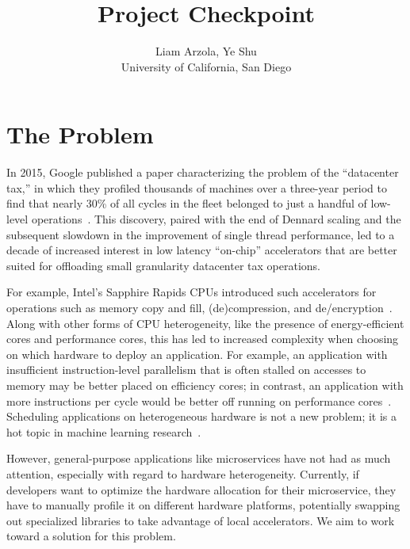 \documentclass[letterpaper,twocolumn,10pt]{article}
\begin{document}
\date{}
\title{Project Checkpoint}

\author{
{\rm Liam Arzola, Ye Shu}\\
University of California, San Diego
}

\maketitle

\section{The Problem}
In 2015, Google published a paper characterizing the problem of the ``datacenter tax,'' in which they profiled thousands of machines over a three-year period to find that nearly 30\% of all cycles in the fleet belonged to just a handful of low-level operations~\cite{kanev2015profiling}.
This discovery, paired with the end of Dennard scaling and the subsequent slowdown in the improvement of single thread performance, led to a decade of increased interest in low latency ``on-chip'' accelerators that are better suited for offloading small granularity datacenter tax operations.

For example, Intel's Sapphire Rapids CPUs introduced such accelerators for operations such as memory copy and fill, (de)compression, and de/encryption~\cite{yuan2024intel}.
Along with other forms of CPU heterogeneity, like the presence of energy-efficient cores and performance cores, this has led to increased complexity when choosing on which hardware to deploy an application.
For example, an application with insufficient instruction-level parallelism that is often stalled on accesses to memory may be better placed on efficiency cores; in contrast, an application with more instructions per cycle would be better off running on performance cores~\cite{kanev2015profiling}.
Scheduling applications on heterogeneous hardware is not a new problem; it is a hot topic in machine learning research~\cite{narayanan2023hetero,subramanya2023sia}.

However, general-purpose applications like microservices have not had as much attention, especially with regard to hardware heterogeneity.
Currently, if developers want to optimize the hardware allocation for their microservice, they have to manually profile it on different hardware platforms, potentially swapping out specialized libraries to take advantage of local accelerators.
We aim to work toward a solution for this problem.
\end{document}
